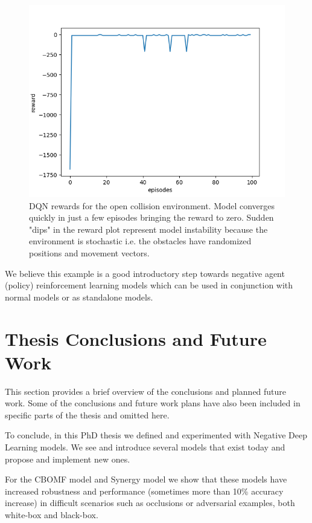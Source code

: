 \documentclass[b5paper]{book}
\begin{document}
\begin{figure}[!ht]
  \centering
  \includegraphics[scale=0.65]{figures/dqn_results.png} 
  \caption{DQN rewards for the open collision environment. Model converges quickly in just a few episodes bringing the reward to zero. Sudden "dips" in the reward plot represent model instability because the environment is stochastic i.e. the obstacles have randomized positions and movement vectors.}
  \label{fig:birdr}
\end{figure}

We believe this example is a good introductory step towards negative agent (policy) reinforcement learning models which can be used in conjunction with normal models or as standalone models. 

\chapter{Thesis Conclusions and Future Work}

This section provides a brief overview of the conclusions and planned future work. Some of the conclusions and future work plans have also been included in specific parts of the thesis and omitted here.

To conclude, in this PhD thesis we defined and experimented with Negative Deep Learning models. We see and introduce several models that exist today and propose and implement new ones.

For the CBOMF model and Synergy model we show that these models have increased robustness and performance (sometimes more than 10\% accuracy increase) in difficult scenarios such as occlusions or adversarial examples, both white-box and black-box.
\end{document}
